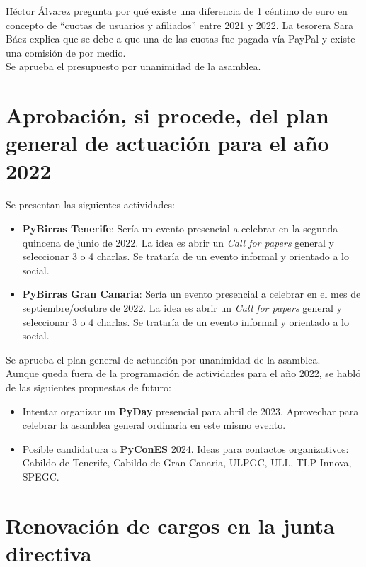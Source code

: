 \documentclass[a4paper,12pt]{article}
\begin{document}
Héctor Álvarez pregunta por qué existe una diferencia de 1 céntimo de euro en concepto de ``cuotas de usuarios y afiliados'' entre 2021 y 2022. La tesorera Sara Báez explica que se debe a que una de las cuotas fue pagada vía PayPal y existe una comisión de por medio.\\

Se aprueba el presupuesto por unanimidad de la asamblea.

\section{Aprobación, si procede, del plan general de actuación para el año 2022}

Se presentan las siguientes actividades:

\begin{itemize}
    \item \textbf{PyBirras Tenerife}: Sería un evento presencial a celebrar en la segunda quincena de junio de 2022. La idea es abrir un \textit{Call for papers} general y seleccionar 3 o 4 charlas. Se trataría de un evento informal y orientado a lo social.
    \item \textbf{PyBirras Gran Canaria}: Sería un evento presencial a celebrar en el mes de septiembre/octubre de 2022. La idea es abrir un \textit{Call for papers} general y seleccionar 3 o 4 charlas. Se trataría de un evento informal y orientado a lo social.
\end{itemize}

Se aprueba el plan general de actuación por unanimidad de la asamblea.\\

Aunque queda fuera de la programación de actividades para el año 2022, se habló de las siguientes propuestas de futuro:

\begin{itemize}
    \item Intentar organizar un \textbf{PyDay} presencial para abril de 2023. Aprovechar para celebrar la asamblea general ordinaria en este mismo evento.
    \item Posible candidatura a \textbf{PyConES} 2024. Ideas para contactos organizativos: Cabildo de Tenerife, Cabildo de Gran Canaria, ULPGC, ULL, TLP Innova, SPEGC.
\end{itemize}

\section{Renovación de cargos en la junta directiva}
\end{document}
